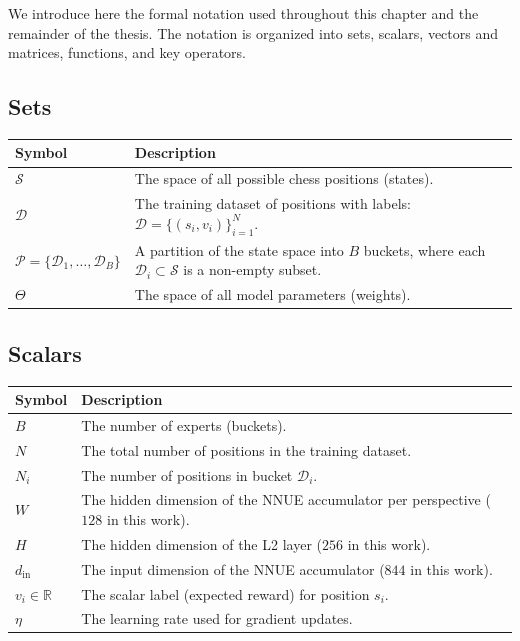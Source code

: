 We introduce here the formal notation used throughout this chapter and the remainder of the thesis. The notation is organized into sets, scalars, vectors and matrices, functions, and key operators.

\subsection{Sets}\label{sec:notation-sets}

\begin{center}
\small
\begin{tabularx}{\textwidth}{@{}>{\raggedright\arraybackslash}p{} X@{}}
\hline
\textbf{Symbol} & \textbf{Description} \\
\hline
\(\mathcal{S}\) &
  The space of all possible chess positions (states). \\
\(\mathcal{D}\) &
  The training dataset of positions with labels: \(\mathcal{D} = \{(s_i, v_i)\}_{i=1}^{N}\). \\
\(\mathcal{P} = \{\mathcal{D}_1, \dots, \mathcal{D}_B\}\) &
  A partition of the state space into \(B\) buckets, where each \(\mathcal{D}_i \subset \mathcal{S}\) is a non-empty subset. \\
\(\Theta\) &
  The space of all model parameters (weights). \\
\hline
\end{tabularx}
\end{center}

\subsection{Scalars}\label{sec:notation-scalars}

\begin{center}
\small
\begin{tabularx}{\textwidth}{@{}l X@{}}
\hline
\textbf{Symbol} & \textbf{Description} \\
\hline
\(B\) & The number of experts (buckets). \\
\(N\) & The total number of positions in the training dataset. \\
\(N_i\) & The number of positions in bucket \(\mathcal{D}_i\). \\
\(W\) & The hidden dimension of the NNUE accumulator per perspective (\(128\) in this work). \\
\(H\) & The hidden dimension of the L2 layer (\(256\) in this work). \\
\(d_{\mathrm{in}}\) & The input dimension of the NNUE accumulator (\(844\) in this work). \\
\(v_i \in \mathbb{R}\) & The scalar label (expected reward) for position \(s_i\). \\
\(\eta\) & The learning rate used for gradient updates. \\
\hline
\end{tabularx}
\end{center}

